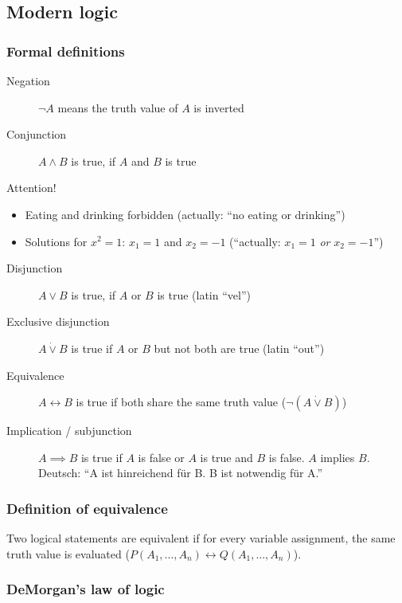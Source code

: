 \documentclass[a4paper,landscape,twocolumn]{article}
\begin{document}
\subsection{Modern logic}
\subsubsection{Formal definitions}

\begin{description}
  \item[Negation]
    $\neg A$ means the truth value of $A$ is inverted
  \item[Conjunction]
    $A \land B$ is true, if $A$ and $B$ is true
\end{description}

Attention!
\begin{itemize}
  \item Eating and drinking forbidden (actually: \enquote{no eating or drinking})
  \item Solutions for $x^2 = 1$: $x_1 = 1$ and $x_2 = -1$ (\enquote{actually: $x_1 = 1$ \emph{or} $x_2 = -1$})
\end{itemize}

\begin{description}
  \item[Disjunction]
    $A \lor B$ is true, if $A$ or $B$ is true (latin \enquote{vel})
  \item[Exclusive disjunction]
    $A \dot\lor B$ is true if $A$ or $B$ but not both are true (latin \enquote{out})
  \item[Equivalence]
    $A \leftrightarrow B$ is true if both share the same truth value ($\neg (A \dot\lor B)$)
  \item[Implication / subjunction]
    $A \implies B$ is true if $A$ is false or $A$ is true and $B$ is false.
    $A$ implies $B$. Deutsch: \enquote{A ist hinreichend für B. B ist notwendig für A.}
\end{description}

\subsubsection{Definition of equivalence}

Two logical statements are equivalent if for every variable assignment,
the same truth value is evaluated ($P(A_1, \ldots, A_n) \leftrightarrow Q(A_1, \ldots, A_n)$).

\subsubsection{DeMorgan's law of logic}
\end{document}
